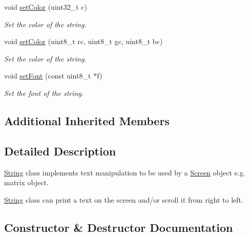 \begin{DoxyCompactItemize}
void \hyperlink{class_string_a4b35e26e6395a36833519bf351bc3567}{set\+Color} (uint32\+\_\+t c)
\begin{DoxyCompactList}\small\item\em Set the color of the string. \end{DoxyCompactList}\item 
void \hyperlink{class_string_aaece4a14fa7a17bf3f52e31e849edd87}{set\+Color} (uint8\+\_\+t rc, uint8\+\_\+t gc, uint8\+\_\+t bc)
\begin{DoxyCompactList}\small\item\em Set the color of the string. \end{DoxyCompactList}\item 
void \hyperlink{class_string_a6e7e01a0933bc9d8aeaf745c39b26020}{set\+Font} (const uint8\+\_\+t $\ast$f)
\begin{DoxyCompactList}\small\item\em Set the font of the string. \end{DoxyCompactList}\end{DoxyCompactItemize}
\subsection*{Additional Inherited Members}


\subsection{Detailed Description}
\hyperlink{class_string}{String} class implements text manipulation to be used by a \hyperlink{class_screen}{Screen} object e.\+g. matrix object. 

\hyperlink{class_string}{String} class can print a text on the screen and/or scroll it from right to left. 

\subsection{Constructor \& Destructor Documentation}
